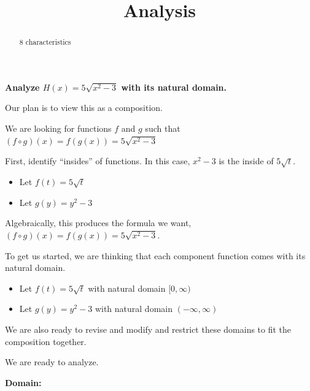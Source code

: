 \documentclass{ximera}
\title{Analysis}
\begin{document}
\begin{abstract}
8 characteristics
\end{abstract}
\maketitle












\textbf{Analyze $H(x) = 5 \sqrt{x^2-3}$ with its natural domain. }








Our plan is to view this as a composition. 






We are looking for functions $f$ and $g$ such that $(f \circ g)(x) = f(g(x)) = 5 \sqrt{x^2-3}$ 


First, identify ``insides'' of functions.  In this case, $x^2 - 3$ is the inside of $5 \sqrt{t}$. 



\begin{itemize}
\item Let $f(t) = 5 \sqrt{t}$ 
\item Let $g(y) = y^2 - 3$ 
\end{itemize}

Algebraically, this produces the formula we want, $(f \circ g)(x) = f(g(x)) = 5 \sqrt{x^2-3}$.

To get us started, we are thinking that each component function comes with its natural domain.

\begin{itemize}
\item Let $f(t) = 5 \sqrt{t}$ with natural domain $[0, \infty)$ 
\item Let $g(y) = y^2 - 3$ with natural domain $(-\infty, \infty)$ 
\end{itemize}

We are also ready to revise and modify and restrict these domains to fit the composition together. 





We are ready to analyze. 




\textbf{\textcolor{blue!55!black}{Domain:}} 
\end{document}
